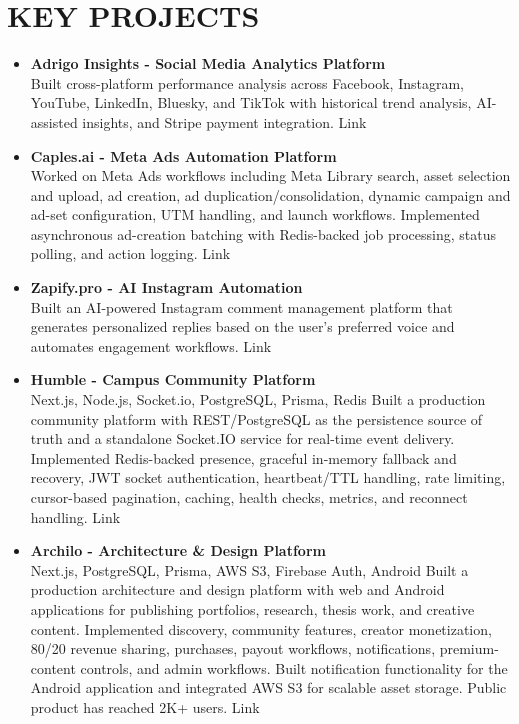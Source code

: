 \documentclass[a4paper,11pt]{article}
\begin{document}
\section*{KEY PROJECTS}
\begin{itemize}
  \item[\textbullet] \textbf{Adrigo Insights - Social Media Analytics Platform} \\
  Built cross-platform performance analysis across Facebook, Instagram, YouTube, LinkedIn, Bluesky, and TikTok with historical trend analysis, AI-assisted insights, and Stripe payment integration. Link
  \vspace{2pt}
  \item[\textbullet] \textbf{Caples.ai - Meta Ads Automation Platform} \\
  Worked on Meta Ads workflows including Meta Library search, asset selection and upload, ad creation, ad duplication/consolidation, dynamic campaign and ad-set configuration, UTM handling, and launch workflows. Implemented asynchronous ad-creation batching with Redis-backed job processing, status polling, and action logging. Link
  \vspace{2pt}
  \item[\textbullet] \textbf{Zapify.pro - AI Instagram Automation} \\
  Built an AI-powered Instagram comment management platform that generates personalized replies based on the user’s preferred voice and automates engagement workflows. Link
  \vspace{2pt}
  \item[\textbullet] \textbf{Humble - Campus Community Platform} \\
  Next.js, Node.js, Socket.io, PostgreSQL, Prisma, Redis Built a production community platform with REST/PostgreSQL as the persistence source of truth and a standalone Socket.IO service for real-time event delivery. Implemented Redis-backed presence, graceful in-memory fallback and recovery, JWT socket authentication, heartbeat/TTL handling, rate limiting, cursor-based pagination, caching, health checks, metrics, and reconnect handling. Link
  \vspace{2pt}
  \item[\textbullet] \textbf{Archilo - Architecture \& Design Platform} \\
  Next.js, PostgreSQL, Prisma, AWS S3, Firebase Auth, Android Built a production architecture and design platform with web and Android applications for publishing portfolios, research, thesis work, and creative content. Implemented discovery, community features, creator monetization, 80/20 revenue sharing, purchases, payout workflows, notifications, premium-content controls, and admin workflows. Built notification functionality for the Android application and integrated AWS S3 for scalable asset storage. Public product has reached 2K+ users. Link

\end{itemize}
\end{document}
